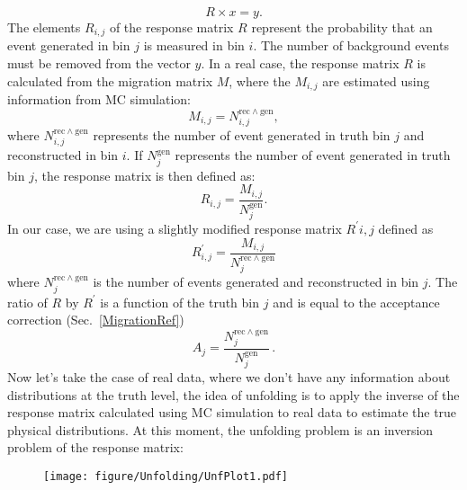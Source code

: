 \begin{equation}
R \times x = y.
\end{equation}
%
The elements $R_{i,j}$ of the response matrix $R$ represent the probability that an event generated in bin $j$ is measured in bin $i$. The number of background events must be removed from the vector $y$. In a real case, the response matrix $R$ is calculated from the migration matrix $M$, where the $M_{i,j}$ are estimated using information from MC simulation:
%
\begin{equation}
M_{i,j} = N_{i,j}^{\mathrm{rec} \land \mathrm{gen}},
\end{equation}
%
where $N_{i,j}^{\mathrm{rec}  \land \mathrm{gen}}$ represents the number of event generated in truth bin $j$ and reconstructed in bin $i$. If {$N_{j}^\mathrm{{gen}}$} represents the number of event generated in truth bin {$j$},
the response matrix is then defined as:
%
\begin{equation}
R_{i,j}=\frac{M_{i,j}}{N^\mathrm{gen}_{j}}.
\end{equation}
%
In our case, we are using a slightly modified response matrix $R^\prime{i,j}$ defined as
\begin{equation}
    R^\prime_{i,j}=\frac{M_{i,j}}{N^{\mathrm{rec} \land \mathrm{gen}}_j}
\end{equation}
where $N^{\mathrm{rec} \land \mathrm{gen}}_j$ is the number of events generated and reconstructed in bin $j$.
The ratio of $R$ by $R^\prime$ is a function of the truth bin $j$ and is equal to the acceptance correction (Sec.~\ref{MigrationRef})
\begin{equation}
    A_j=\frac{N^{\mathrm{rec} \land \mathrm{gen}}_j}{N_j^\mathrm{gen}}\,.
\end{equation}
Now let's take the case of real data, where we don't have any information about distributions at the truth level, the idea of unfolding is to apply the inverse of the response matrix calculated using MC simulation to real data to estimate the true physical distributions. At this moment, the unfolding problem is an inversion problem of the response matrix:


\begin{figure}[H]
\centering
\texttt{[image: figure/Unfolding/UnfPlot1.pdf]}
\centering
\label{fig1}
\end{figure}
%

